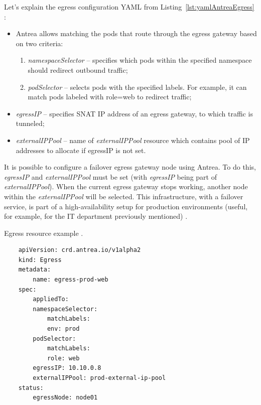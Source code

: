 Let's explain the egress configuration YAML from Listing~\ref{lst:yamlAntreaEgress} \cite{AntreaDocs}:
\begin{itemize}
    \item Antrea allows matching the pods that route through the egress gateway based on two criteria:

    \begin{enumerate}
        \item \textit{namespaceSelector} -- specifies which pods within the specified namespace should redirect outbound traffic;
        \item \textit{podSelector} -- selects pods with the specified labels. For example, it can match pods labeled with role=web to redirect traffic;
    \end{enumerate}

    \item \textit{egressIP} -- specifies SNAT IP address of an egress gateway, to which traffic is tunneled;
    \item \textit{externalIPPool} -- name of \textit{externalIPPool} resource which contains pool of IP addresses to allocate if egressIP is not set.
\end{itemize}

It is possible to configure a failover egress gateway node using Antrea. To do this, \textit{egressIP} and \textit{externalIPPool} must be set (with \textit{egressIP} being part of \textit{externalIPPool}). When the current egress gateway stops working, another node within the \textit{externalIPPool} will be selected. This infrastructure, with a failover service, is part of a high-availability setup for production environments (useful, for example, for the IT department previously mentioned) \cite{AntreaDocs}.


\begin{listing}[htb]
    \centering
    \caption{Egress resource example \cite{AntreaDocs}.}
    \begin{verbatim}
    apiVersion: crd.antrea.io/v1alpha2
    kind: Egress
    metadata:
        name: egress-prod-web
    spec:
        appliedTo:
        namespaceSelector:
            matchLabels:
            env: prod
        podSelector:
            matchLabels:
            role: web
        egressIP: 10.10.0.8
        externalIPPool: prod-external-ip-pool
    status:
        egressNode: node01
    \end{verbatim}
    \label{lst:yamlAntreaEgress}
\end{listing}

